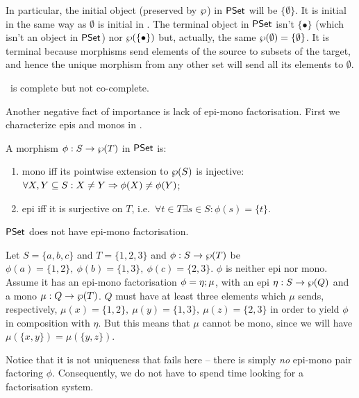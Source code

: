 \documentclass[10pt]{article}
\begin{document}
\noindent
In particular, the initial object (preserved by $\wp$) in $\mbox{\rm\sf PSet}$
will be $\{\emptyset\}$.  It is initial in the same way as $\emptyset$
is initial in \Set.  The terminal object in $\mbox{\rm\sf PSet}$ isn't $\{\bullet\}$
(which isn't an object in $\mbox{\rm\sf PSet}$) nor $\wp(\{\bullet\})$ but,
actually, the same $\wp(\emptyset)=\{\emptyset\}$. It is terminal because
morphisms send elements of the source to subsets of the target, and
hence the unique morphism from any other set will send all its
elements to $\emptyset$.

\begin{Prop}
\label{le:PStcompl}\label{le:PSnocoeq}
\PSt\ is complete but not co-complete.
\end{Prop}

\noindent
Another negative fact of importance is lack of epi-mono factorisation. 
First we characterize epis and monos in \PSt.

\begin{Lemma}
\label{le:charepimono}
A morphism $\phi:S\rightarrow \wp(T)$ in $\mbox{\rm\sf PSet}$ is:
\begin{enumerate}\MyLPar
\item 
mono iff its pointwise extension to $\wp(S)$ is injective:
$\forall X,Y\subseteq S: X\not=Y \Rightarrow \phi(X)\not=\phi(Y)$;
\item 
epi iff it is surjective on $T$, i.e.\ $\forall t\in T \exists s\in S:
\phi(s)=\{t\}$.
\end{enumerate}
\end{Lemma}

\begin{Lemma}
\label{le:noepi-mono}
$\mbox{\rm\sf PSet}$ does not have epi-mono factorisation.
\end{Lemma}

\begin{Proof}
Let $S=\{a,b,c\}$ and $T=\{1,2,3\}$ and $\phi:S\rightarrow\wp(T)$ be
$\phi(a)=\{1,2\},\ \phi(b)=\{1,3\},\ \phi(c)=\{2,3\}$. $\phi$ is
neither epi nor mono.  Assume it has an epi-mono factorisation
$\phi=\eta;\mu$, with an epi $\eta:S\rightarrow\wp(Q)$ and a mono
$\mu:Q\rightarrow\wp(T)$. $Q$ must have at least three elements which
$\mu$ sends, respectively, $\mu(x)=\{1,2\},\ \mu(y)=\{1,3\},\
\mu(z)=\{2,3\}$ in order to yield $\phi$ in composition with
$\eta$. But this means that $\mu$ cannot be mono, since we will have
$\mu(\{x,y\})=\mu(\{y,z\})$.
\end{Proof}

\noindent
Notice that it is not uniqueness that fails here -- there is simply {\em no}
epi-mono pair factoring $\phi$. Consequently, we do not have to spend time
looking for a factorisation system.
\end{document}
